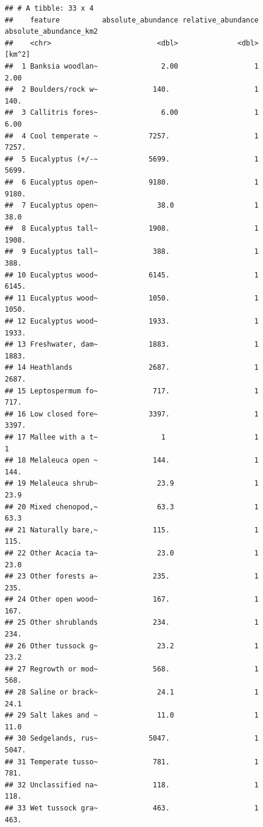 \documentclass[
  12pt,
]{book}
\begin{document}
\begin{verbatim}
## # A tibble: 33 x 4
##    feature          absolute_abundance relative_abundance absolute_abundance_km2
##    <chr>                         <dbl>              <dbl>                 [km^2]
##  1 Banksia woodlan~               2.00                  1                   2.00
##  2 Boulders/rock w~             140.                    1                 140.  
##  3 Callitris fores~               6.00                  1                   6.00
##  4 Cool temperate ~            7257.                    1                7257.  
##  5 Eucalyptus (+/-~            5699.                    1                5699.  
##  6 Eucalyptus open~            9180.                    1                9180.  
##  7 Eucalyptus open~              38.0                   1                  38.0 
##  8 Eucalyptus tall~            1908.                    1                1908.  
##  9 Eucalyptus tall~             388.                    1                 388.  
## 10 Eucalyptus wood~            6145.                    1                6145.  
## 11 Eucalyptus wood~            1050.                    1                1050.  
## 12 Eucalyptus wood~            1933.                    1                1933.  
## 13 Freshwater, dam~            1883.                    1                1883.  
## 14 Heathlands                  2687.                    1                2687.  
## 15 Leptospermum fo~             717.                    1                 717.  
## 16 Low closed fore~            3397.                    1                3397.  
## 17 Mallee with a t~               1                     1                   1   
## 18 Melaleuca open ~             144.                    1                 144.  
## 19 Melaleuca shrub~              23.9                   1                  23.9 
## 20 Mixed chenopod,~              63.3                   1                  63.3 
## 21 Naturally bare,~             115.                    1                 115.  
## 22 Other Acacia ta~              23.0                   1                  23.0 
## 23 Other forests a~             235.                    1                 235.  
## 24 Other open wood~             167.                    1                 167.  
## 25 Other shrublands             234.                    1                 234.  
## 26 Other tussock g~              23.2                   1                  23.2 
## 27 Regrowth or mod~             568.                    1                 568.  
## 28 Saline or brack~              24.1                   1                  24.1 
## 29 Salt lakes and ~              11.0                   1                  11.0 
## 30 Sedgelands, rus~            5047.                    1                5047.  
## 31 Temperate tusso~             781.                    1                 781.  
## 32 Unclassified na~             118.                    1                 118.  
## 33 Wet tussock gra~             463.                    1                 463.
\end{verbatim}
\end{document}
